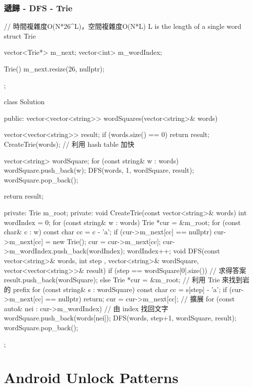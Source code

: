 \subsubsection{遞歸 - DFS - Trie}
\begin{Code}
// 時間複雜度O(N*26^L)，空間複雜度O(N*L) L is the length of a single word
struct Trie
{
    vector<Trie*> m_next;
    vector<int> m_wordIndex;

    Trie() { m_next.resize(26, nullptr); }
};

class Solution {
public:
    vector<vector<string>> wordSquares(vector<string>& words) {
        vector<vector<string>> result;
        if (words.size() == 0) return result;
        CreateTrie(words); // 利用 hash table 加快


        vector<string> wordSquare;
        for (const string& w : words)
        {
            wordSquare.push_back(w);
            DFS(words, 1, wordSquare, result);
            wordSquare.pop_back();
        }

        return result;
    }
private:
    Trie m_root;
private:
    void CreateTrie(const vector<string>& words)
    {
        int wordIndex = 0;
        for (const string& w : words)
        {
            Trie *cur = &m_root;
            for (const char& c : w)
            {
                const char cc = c - 'a';
                if (cur->m_next[cc] == nullptr)
                    cur->m_next[cc] = new Trie();
                cur = cur->m_next[cc];
                cur->m_wordIndex.push_back(wordIndex);
            }
            wordIndex++;
        }
    }
    void DFS(const vector<string>& words, int step
             , vector<string>& wordSquare, vector<vector<string>>& result)
    {
        if (step == wordSquare[0].size())
        {
            // 求得答案
            result.push_back(wordSquare);
        }
        else
        {
            Trie *cur = &m_root;
            // 利用 Trie 來找到岩的 prefix
            for (const string& s : wordSquare)
            {
                const char cc = s[step] - 'a';
                if (cur->m_next[cc] == nullptr) return;
                cur = cur->m_next[cc];
            }
            // 擴展
            for (const auto& nei : cur->m_wordIndex)
            {
                // 由 index 找回文字
                wordSquare.push_back(words[nei]);
                DFS(words, step+1, wordSquare, result);
                wordSquare.pop_back();
            }
        }
    }
};
\end{Code}

\section{Android Unlock Patterns} %
\label{sec:android-unlock-patterns}


